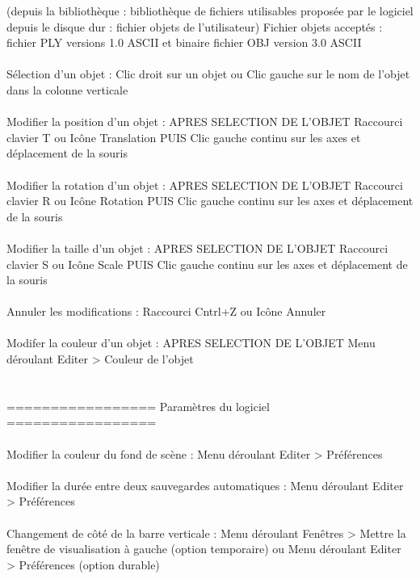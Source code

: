 	   	      	       		     (depuis la bibliothèque : bibliothèque de fichiers utilisables proposée par le logiciel
					      depuis le disque dur   : fichier objets de l'utilisateur)
		Fichier objets acceptés : fichier PLY versions 1.0 ASCII et binaire
			       		  fichier OBJ version  3.0 ASCII
\\ \\
Sélection d'un objet :			Clic droit sur un objet
	       	     			ou     Clic gauche sur le nom de l'objet dans la colonne verticale
\\ \\
Modifier la position d'un objet :	APRES SELECTION DE L'OBJET
	    	     	  		Raccourci clavier T
					ou     Icône Translation
					PUIS Clic gauche continu sur les axes et déplacement de la souris
\\ \\
Modifier la rotation d'un objet :	APRES SELECTION DE L'OBJET
	    	     	  		Raccourci clavier R
					ou     Icône Rotation
					PUIS Clic gauche continu sur les axes et déplacement de la souris
\\ \\
Modifier la taille d'un objet :		APRES SELECTION DE L'OBJET
	    	     	  		Raccourci clavier S
					ou     Icône Scale
					PUIS Clic gauche continu sur les axes et déplacement de la souris
\\ \\
Annuler les modifications :		Raccourci Cntrl+Z
	    		  		ou     Icône Annuler
\\ \\
Modifer la couleur d'un objet :		APRES SELECTION DE L'OBJET
	   	   	      		Menu déroulant Editer > Couleur de l'objet
\\ \\ \\
================= Paramètres du logiciel =================
\\ \\
Modifier la couleur du fond de scène :	Menu déroulant Editer > Préférences
\\ \\
Modifier la durée entre deux 
	 sauvegardes automatiques :	Menu déroulant Editer > Préférences
\\ \\
Changement de côté de la barre 
	 verticale :			Menu déroulant Fenêtres > Mettre la fenêtre de visualisation à gauche (option temporaire)
	 	   			ou     Menu déroulant Editer > Préférences (option durable)
\\ \\
